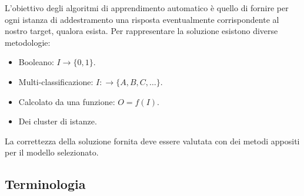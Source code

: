 L'obiettivo degli algoritmi di apprendimento automatico è quello di fornire per
ogni istanza di addestramento una risposta eventualmente corrispondente al nostro
target, qualora esista. Per rappresentare la soluzione esistono diverse metodologie:
\begin{itemize}
    \item Booleano: $I \to \{0, 1\}$.
    \item Multi-classificazione: $I: \to \{A, B, C, \dots\}$.
    \item Calcolato da una funzione: $O = f(I)$.
    \item Dei cluster di istanze.
\end{itemize}

La correttezza della soluzione fornita deve essere valutata con dei metodi appositi
per il modello selezionato.
\subsection{Terminologia}
